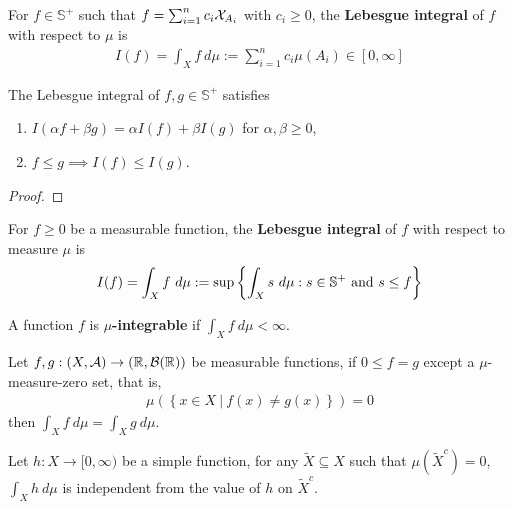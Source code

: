 \documentclass[11pt]{article}
\numberwithin{equation}{section}
\begin{document}
	
	\begin{definition}
		For $f \in \mathbb{S}^+$ such that $f = \sum_{i=1}^n c_i \mathcal{{X}}_{A_i}$ with $c_i \geq 0$, the \textbf{Lebesgue integral} of $f$ with respect to $\mu$ is
		\begin{align}
			I(f) = \int_X f\ d\mu := \sum_{i=1}^n c_i \mu(A_i) \in [0, \infty]
		\end{align}
	\end{definition}
	
	\begin{theorem}
		The Lebesgue integral of $f, g \in \mathbb{S}^+$ satisfies
		\begin{enumerate}
			\item $I(\alpha f + \beta g) = \alpha I(f) + \beta I(g)$ for $\alpha, \beta \geq 0$,
			\item $f \leq g \implies I(f) \leq I(g)$.
		\end{enumerate}
	\end{theorem}
	
	\begin{proof}
		
	\end{proof}
	
	\begin{definition}
		For $f \geq 0$ be a measurable function, the \textbf{Lebesgue integral} of $f$ with respect to measure $\mu$ is
		\begin{align}
			I(f) = \int_X f\ d\mu := \sup\left\{\int_X s\ d\mu: s \in \mathbb{S}^+ \text{{ and }} s \leq f \right\}
		\end{align}
	\end{definition}
	
	\begin{definition}
		A function $f$ is \textbf{$\mu$-integrable} if $\int_X f\ d\mu < \infty$.
	\end{definition}
	
	\begin{theorem}\label{thm:1}
		Let $f, g: (X, \mathcal{{A}}) \to (\mathbb{R}, \mathcal{{B}}(\mathbb{R}))$ be measurable functions, if $0 \leq f = g$ except a $\mu$-measure-zero set, that is,
		\begin{align}
			\mu\left(\left\{
				x \in X\ |\ f(x) \neq g(x)
			\right\}\right) = 0
		\end{align}
		then $\int_X f\ d\mu = \int_X g\ d\mu$.
	\end{theorem}
	
	\begin{lemma}\label{lem:1}
		Let $h: X \to [0, \infty)$ be a simple function, for any $\tilde{X} \subseteq X$ such that $\mu(\tilde{X}^c) = 0$, $\int_X h\ d\mu$ is independent from the value of $h$ on $\tilde{X}^c$.
	\end{lemma}
	
\end{document}

